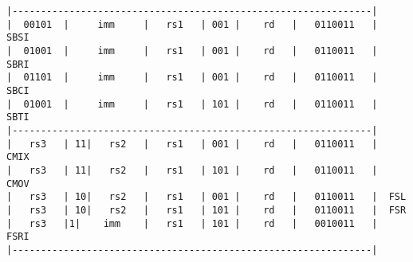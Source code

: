 \begin{minipage}{\linewidth}
\begin{verbatim}
|---------------------------------------------------------------|
|  00101  |     imm     |   rs1   | 001 |    rd   |   0110011   |  SBSI
|  01001  |     imm     |   rs1   | 001 |    rd   |   0110011   |  SBRI
|  01101  |     imm     |   rs1   | 001 |    rd   |   0110011   |  SBCI
|  01001  |     imm     |   rs1   | 101 |    rd   |   0110011   |  SBTI
|---------------------------------------------------------------|
|   rs3   | 11|   rs2   |   rs1   | 001 |    rd   |   0110011   |  CMIX
|   rs3   | 11|   rs2   |   rs1   | 101 |    rd   |   0110011   |  CMOV
|   rs3   | 10|   rs2   |   rs1   | 001 |    rd   |   0110011   |  FSL
|   rs3   | 10|   rs2   |   rs1   | 101 |    rd   |   0110011   |  FSR
|   rs3   |1|    imm    |   rs1   | 101 |    rd   |   0010011   |  FSRI
|---------------------------------------------------------------|
\end{verbatim}
\end{minipage}


